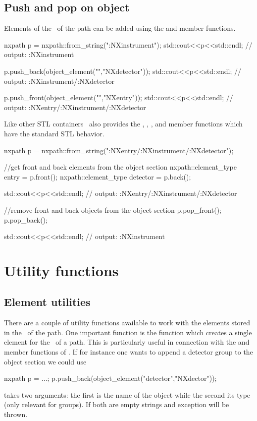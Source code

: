 \subsection{Push and pop on object}

Elements of the \osection\ of the path can be added using the 
and  member functions. 
\begin{cppcode}
nxpath p = nxpath::from_string(":NXinstrument");
std::cout<<p<<std::endl; // output: :NXinstrument

p.push_back(object_element("","NXdetector"));
std::cout<<p<<std::endl; // output: :NXinstrument/:NXdetector

p.push_front(object_element("","NXentry"));
std::cout<<p<<std::endl; // output: :NXentry/:NXinstrument/:NXdetector
\end{cppcode}
Like other STL containers \nxpath\ also provides the , , 
, and  member functions which have the 
standard STL behavior. 
\begin{cppcode}
nxpath p = nxpath::from_string(":NXentry/:NXinstrument/:NXdetector");

//get front and back elements from the object section
nxpath::element_type entry = p.front();
nxpath::element_type detector = p.back();

std::cout<<p<<std::endl; // output: :NXentry/:NXinstrument/:NXdetector

//remove front and back objects from the object section
p.pop_front();
p.pop_back();

std::cout<<p<<std::endl; // output: :NXinstrument

\end{cppcode}




\section{Utility functions}

\subsection{Element utilities}

There are a couple of utility functions available to work with the elements 
stored in the \osection\ of the path.
One important function is the  function which 
creates a single element for the \osection\ of a path. This is particularly 
useful in connection with the  and  member 
functions of \nxpath. 
If for instance one wants to append a detector group to the object section
we could use
\begin{cppcode}
nxpath p = ...;
p.push_back(object_element("detector","NXdector"));
\end{cppcode}
 takes two arguments: the first is the name of the object
while the second its type (only relevant for groups). If both are empty strings
and exception will be thrown.

